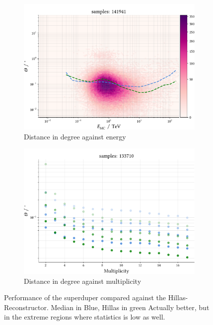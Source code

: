 \begin{figure}
    \centering
    \begin{subfigure}{0.75\textwidth}
        \includegraphics[width=\linewidth]{../analysis/plots/gamma_cut/pairwise_median_100_vs_energy.pdf} 
        \caption{Distance in degree against energy}
    \end{subfigure}
    \begin{subfigure}{0.75\textwidth}
        \includegraphics[width=\linewidth]{../analysis/plots/gamma_cut/pairwise_median_100_vs_multi_comp.pdf}
        \caption{Distance in degree against multiplicity}
    \end{subfigure}
    \caption{Performance of the superduper compared 
    against the Hillas-Reconstructor. Median in Blue, Hillas in green
    Actually better, but in the extreme regions where statistics is low as well.}
    \label{fig:stereo_double}
\end{figure}


